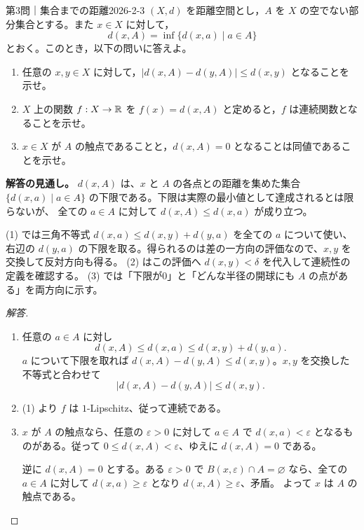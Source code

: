 \begin{problem}{第3問｜集合までの距離}{2026-2-3}
$(X,d)$ を距離空間とし，$A$ を $X$ の空でない部分集合とする。また $x\in X$ に対して，
\[
d(x,A)=\inf\{d(x,a)\mid a\in A\}
\]
とおく。このとき，以下の問いに答えよ。
\begin{enumerate}
  \item[(1)] 任意の $x,y\in X$ に対して，$|d(x,A)-d(y,A)|\le d(x,y)$ となることを示せ。
  \item[(2)] $X$ 上の関数 $f:X\to\mathbb{R}$ を $f(x)=d(x,A)$ と定めると，$f$ は連続関数となることを示せ。
  \item[(3)] $x\in X$ が $A$ の触点であることと，$d(x,A)=0$ となることは同値であることを示せ。
\end{enumerate}
\end{problem}
\begin{memo*}
\textbf{解答の見通し。}
$d(x,A)$ は、$x$ と $A$ の各点との距離を集めた集合
$\{d(x,a)\mid a\in A\}$ の下限である。下限は実際の最小値として達成されるとは限らないが、
全ての $a\in A$ に対して $d(x,A)\le d(x,a)$ が成り立つ。

(1) では三角不等式 $d(x,a)\le d(x,y)+d(y,a)$ を全ての $a$ について使い、
右辺の $d(y,a)$ の下限を取る。得られるのは差の一方向の評価なので、$x,y$ を交換して反対方向も得る。
(2) はこの評価へ $d(x,y)<\delta$ を代入して連続性の定義を確認する。
(3) では「下限が0」と「どんな半径の開球にも $A$ の点がある」を両方向に示す。
\end{memo*}
\begin{proof}[解答]
\begin{enumerate}
  \item[(1)] 任意の $a\in A$ に対し
  \[
  d(x,A)\le d(x,a)\le d(x,y)+d(y,a).
  \]
  $a$ について下限を取れば
  $d(x,A)-d(y,A)\le d(x,y)$。$x,y$ を交換した不等式と合わせて
  \[
  |d(x,A)-d(y,A)|\le d(x,y).
  \]

  \item[(2)] (1) より $f$ は $1$-Lipschitz、従って連続である。

  \item[(3)] $x$ が $A$ の触点なら、任意の $\varepsilon>0$ に対して
  $a\in A$ で $d(x,a)<\varepsilon$ となるものがある。従って
  $0\le d(x,A)<\varepsilon$、ゆえに $d(x,A)=0$ である。

  逆に $d(x,A)=0$ とする。ある $\varepsilon>0$ で
  $B(x,\varepsilon)\cap A=\varnothing$ なら、全ての $a\in A$ に対して
  $d(x,a)\ge\varepsilon$ となり $d(x,A)\ge\varepsilon$、矛盾。
  よって $x$ は $A$ の触点である。
\end{enumerate}
\end{proof}
